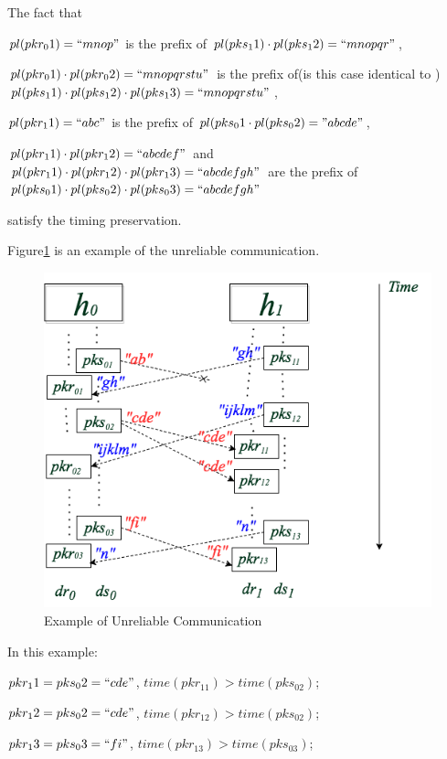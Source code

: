 The fact that
 
$pl(pkr_01) = ``mnop"$ is the prefix of $pl(pks_11) \cdot  pl(pks_12) = ``mnopqr"$,

$pl(pkr_01) \cdot pl(pkr_02)=``mnopqrstu"$ is the prefix of(is this case identical to ) $pl(pks_11) \cdot pl(pks_12) \cdot pl(pks_13) = ``mnopqrstu" $,  

$pl(pkr_11)=``abc"$ is the prefix of $pl(pks_01 \cdot pl(pks_02) = "abcde"$,  

$pl(pkr_11) \cdot pl(pkr_12)= ``abcdef"$ and  $pl(pkr_11) \cdot pl(pkr_12) \cdot pl(pkr_13) = ``abcdefgh"$ are  the prefix of  $pl(pks_01) \cdot pl(pks_02) \cdot pl(pks_03)= ``abcdefgh"$

satisfy the timing preservation. 


Figure\ref{unreliableexample} is an example of the unreliable communication. 

\begin{figure}[H]
\centerline{\includegraphics[scale=0.55]{Figures/unreliableexample}}
\caption{Example of Unreliable Communication}
\label{unreliableexample}
\end{figure}

In this example:

$pkr_11 = pks_02=``cde"$, $time(pkr_11) > time(pks_02)$; 

$pkr_12 = pks_02=``cde"$, $time(pkr_12) > time(pks_02)$; 

$pkr_13 = pks_03=``fi"$, $time(pkr_13) > time(pks_03)$;

